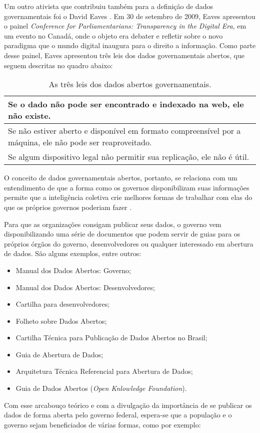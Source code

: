 Um outro ativista que contribuiu também para a definição de dados governamentais foi o David Eaves \cite{3leis}. Em 30 de setembro de 2009, Eaves apresentou o painel \emph{Conference for Parliamentarians: Transparency in the Digital Era}, em um evento no Canadá, onde o objeto era debater e refletir sobre o novo paradigma que o mundo digital inaugura para o direito a informação. Como parte desse painel, Eaves apresentou três leis dos dados governamentais abertos, que seguem descritas no quadro abaixo:
\begin{table}[H]
\begin{center}
    \begin{tabular}{ | p{10cm} | }
    \hline
   Se o dado não pode ser encontrado e indexado na web, ele não existe.\\ \hline
   Se não estiver aberto e disponível em formato compreensível por a máquina, ele não pode ser reaproveitado.\\ \hline
   Se algum dispositivo legal não permitir sua replicação, ele não é útil.\\ \hline
    \end{tabular}
    \caption{As três leis dos dados abertos governamentais.}
    \label{tab-leis-lehman}
\end{center}
\end{table}
O conceito de dados governamentais abertos, portanto, se relaciona com um entendimento de que a forma como os governos disponibilizam suas informações permite que a inteligência coletiva crie melhores formas de trabalhar com elas do que os próprios governos poderiam fazer \cite{silva}.

Para que as organizações consigam publicar seus dados, o governo vem disponibilizando uma série de documentos que podem servir de guias para os próprios órgãos do governo, desenvolvedores ou qualquer interessado em abertura de dados. São alguns exemplos, entre outros:

\begin{itemize}
\item Manual dos Dados Abertos: Governo;
\item Manual dos Dados Abertos: Desenvolvedores;
\item Cartilha para desenvolvedores;
\item Folheto sobre Dados Abertos;
\item Cartilha Técnica para Publicação de Dados Abertos no Brasil;
\item Guia de Abertura de Dados;
\item Arquitetura Técnica Referencial para Abertura de Dados;
\item Guia de Dados Abertos (\emph{Open Knlowledge Foundation}).

\end{itemize}
Com esse arcabouço teórico e com a divulgação da importância de se publicar os dados de forma aberta pelo governo federal, espera-se que a população e o governo sejam beneficiados de várias formas, como por exemplo:


